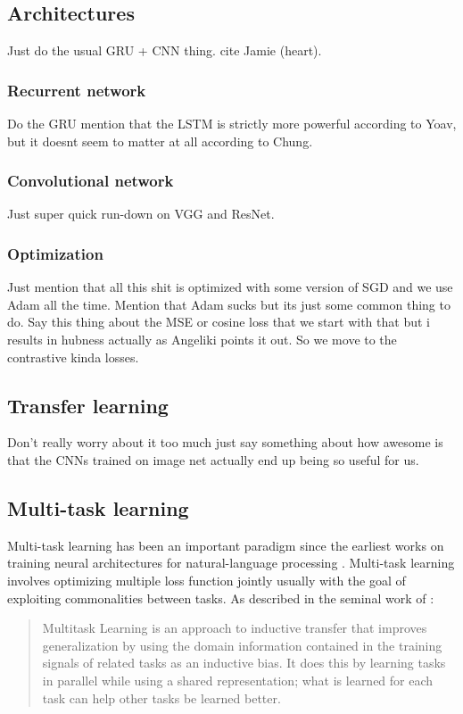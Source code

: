 \subsection{Architectures}
Just do the usual GRU + CNN thing. cite Jamie (heart).

\subsubsection{Recurrent network}
Do the GRU mention that the LSTM is strictly more powerful according to Yoav, but it doesnt seem to matter at all according to Chung.

\subsubsection{Convolutional network}
Just super quick run-down on VGG and ResNet.

\subsubsection{Optimization}
Just mention that all this shit is optimized with some version of SGD and we use Adam all the time. Mention that Adam sucks but its just some common thing to do. Say this thing about the MSE or cosine loss that we start with that but i results in hubness actually as Angeliki points it out. So we move to the contrastive kinda losses.

\subsection{Transfer learning}
Don't really worry about it too much just say something about how awesome is that the CNNs trained on image net actually end up being so useful for us.

\subsection{Multi-task learning}
Multi-task learning has been an important paradigm since the earliest works on training neural architectures for natural-language processing \cite{collobert2008unified}. Multi-task learning involves optimizing multiple loss function jointly usually with the goal of exploiting commonalities between tasks. As described in the seminal work of \cite{caruana1997multitask}:

\begin{quote}
Multitask Learning is an approach to inductive transfer that improves generalization by using the domain information contained in the training signals of related tasks as an inductive bias. It does this by learning tasks in parallel while using a shared representation; what is learned for each task can help other tasks be learned better.
\end{quote}

